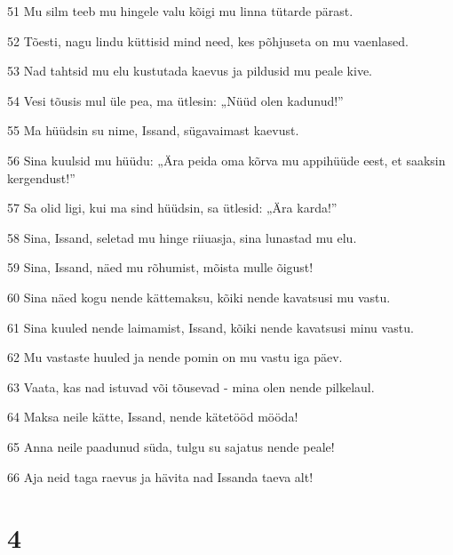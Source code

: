 \par 51 Mu silm teeb mu hingele valu kõigi mu linna tütarde pärast.
\par 52 Tõesti, nagu lindu küttisid mind need, kes põhjuseta on mu vaenlased.
\par 53 Nad tahtsid mu elu kustutada kaevus ja pildusid mu peale kive.
\par 54 Vesi tõusis mul üle pea, ma ütlesin: „Nüüd olen kadunud!”
\par 55 Ma hüüdsin su nime, Issand, sügavaimast kaevust.
\par 56 Sina kuulsid mu hüüdu: „Ära peida oma kõrva mu appihüüde eest, et saaksin kergendust!”
\par 57 Sa olid ligi, kui ma sind hüüdsin, sa ütlesid: „Ära karda!”
\par 58 Sina, Issand, seletad mu hinge riiuasja, sina lunastad mu elu.
\par 59 Sina, Issand, näed mu rõhumist, mõista mulle õigust!
\par 60 Sina näed kogu nende kättemaksu, kõiki nende kavatsusi mu vastu.
\par 61 Sina kuuled nende laimamist, Issand, kõiki nende kavatsusi minu vastu.
\par 62 Mu vastaste huuled ja nende pomin on mu vastu iga päev.
\par 63 Vaata, kas nad istuvad või tõusevad - mina olen nende pilkelaul.
\par 64 Maksa neile kätte, Issand, nende kätetööd mööda!
\par 65 Anna neile paadunud süda, tulgu su sajatus nende peale!
\par 66 Aja neid taga raevus ja hävita nad Issanda taeva alt!

\chapter{4}

